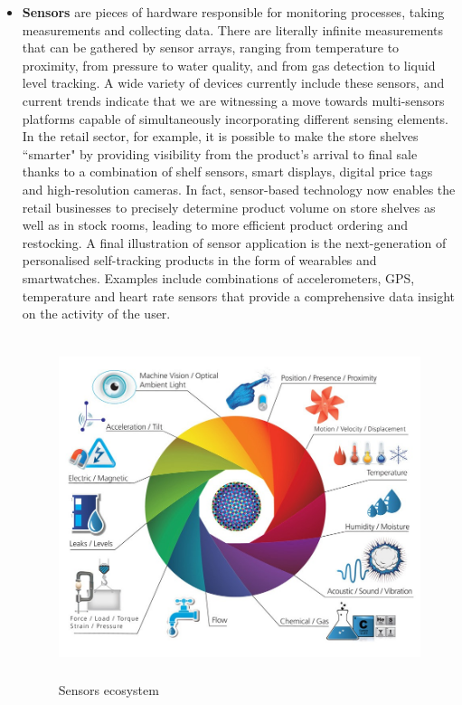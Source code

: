 \begin{itemize}
  \item \textbf{Sensors} are pieces of hardware responsible for monitoring processes, taking measurements and collecting data. There are literally infinite measurements that can be gathered by sensor arrays, ranging from temperature to proximity, from pressure to water quality, and from gas detection to liquid level tracking. A wide variety of devices currently include these sensors, and current trends indicate that we are witnessing a move towards multi-sensors platforms capable of simultaneously incorporating different sensing elements. In the retail sector, for example, it is possible to make the store shelves ``smarter" by providing visibility from the product's arrival to final sale thanks to a combination of shelf sensors, smart displays, digital price tags and high-resolution cameras. In fact, sensor-based technology now enables the retail businesses to precisely determine product volume on store shelves as well as in stock rooms, leading to more efficient product ordering and restocking. A final illustration of sensor application is the next-generation of personalised self-tracking products in the form of wearables and smartwatches. Examples include combinations of accelerometers, GPS, temperature and heart rate sensors that provide a comprehensive data insight on the activity of the user.   
  

  \vspace{0.5cm}
  \begin{figure}[htbp]
    \centering
      \includegraphics[height=10cm]{images/iot-sensors.jpg}
    \caption{Sensors ecosystem}
    \label{fig:sensors}
  \end{figure}
  \vspace{0.5cm}

\end{itemize} 

